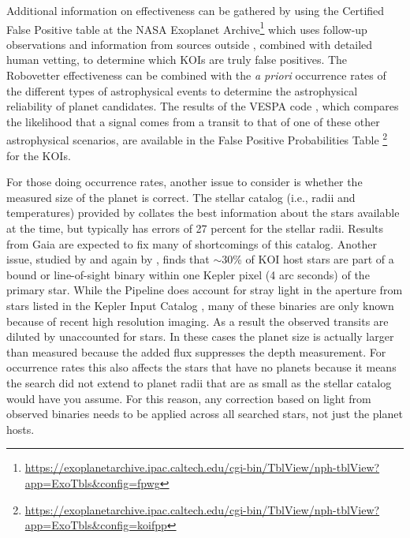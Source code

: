 Additional information on effectiveness can be gathered by using the Certified False Positive table at the NASA Exoplanet Archive\footnote{\url{https://exoplanetarchive.ipac.caltech.edu/cgi-bin/TblView/nph-tblView?app=ExoTbls\&config=fpwg}} which uses follow-up observations and information from sources outside \kepler{}, combined with detailed human vetting, to determine which KOIs are truly false positives. The Robovetter effectiveness can be combined with the \emph{a priori} occurrence rates of the different types of astrophysical events to determine the astrophysical reliability of planet candidates. The results of the VESPA code \citep[][]{Morton2016}, which compares the likelihood that a signal comes from a transit to that of one of these other astrophysical scenarios, are available in the False Positive Probabilities Table \footnote{\url{https://exoplanetarchive.ipac.caltech.edu/cgi-bin/TblView/nph-tblView?app=ExoTbls\&config=koifpp}} for the KOIs.

For those doing occurrence rates, another issue to consider is whether the measured size of the planet is correct. The stellar catalog (i.e., radii and temperatures) provided by \citet{Mathur2017ApJS} collates the best information about the \Kepler{} stars available at the time, but typically has errors of 27 percent for the stellar radii. Results from Gaia \citep{gaia1,gaia2} are expected to fix many of shortcomings of this catalog. Another issue, studied by \citet{Ciardi2015} and again by \citet{Furlan2017}, finds that $\sim$30\% of KOI host stars are part of a bound or line-of-sight binary within one Kepler pixel (4 arc seconds) of the primary star. While the \Kepler{} Pipeline does account for stray light in the aperture from stars listed in the Kepler Input Catalog \citep{Brown2011}, many of these binaries are only known because of recent high resolution imaging. As a result the observed transits are diluted by unaccounted for stars. In these cases the planet size is actually larger than measured because the added flux suppresses the depth measurement. For occurrence rates this also affects the stars that have no planets because it means the search did not extend to planet radii that are as small as the stellar catalog would have you assume.  For this reason, any correction based on light from observed binaries needs to be applied across all searched stars, not just the planet hosts.



